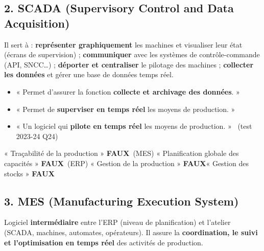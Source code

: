 \documentclass[11pt,a4paper]{article}
\newcommand{\ar}[1]{\textarabic{#1}}
\newcommand{\fr}[1]{\textfrench{#1}}
\newcommand{\faux}{\textcolor{rouge}{\textbf{FAUX}}}
\begin{document}
\subsection*{2. SCADA (Supervisory Control and Data Acquisition)}
Il sert à : \textbf{représenter graphiquement} les machines et visualiser leur état (écrans de supervision) ; \textbf{communiquer} avec les systèmes de contrôle-commande (API, SNCC…) ; \textbf{déporter et centraliser} le pilotage des machines ; \textbf{collecter les données} et gérer une base de données temps réel.
\begin{examen}
\begin{itemize}
\item « Permet d'assurer la fonction \textbf{collecte et archivage des données}. »
\item « Permet de \textbf{superviser en temps réel} les moyens de production. »
\item « Un logiciel qui \textbf{pilote en temps réel} les moyens de production. » \ (test 2023-24 Q24)
\end{itemize}
\end{examen}
\begin{piege}
« Traçabilité de la production » \faux \ \ar{(\fr{MES})} \quad « Planification globale des capacités » \faux \ \ar{(\fr{ERP})} \quad « Gestion de la production » \faux \quad « Gestion des stocks » \faux
\end{piege}

\subsection*{3. MES (Manufacturing Execution System)}
Logiciel \textbf{intermédiaire} entre l'ERP (niveau de planification) et l'atelier (SCADA, machines, automates, opérateurs). Il assure la \textbf{coordination, le suivi et l'optimisation en temps réel} des activités de production.
\end{document}
